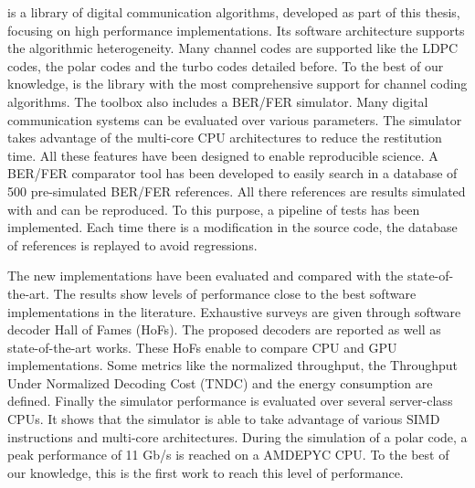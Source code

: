 \AFFECT is a library of digital communication algorithms, developed as part of
this thesis, focusing on high performance implementations. Its software
architecture supports the algorithmic heterogeneity. Many channel codes are
supported like the LDPC codes, the polar codes and the turbo codes detailed
before. To the best of our knowledge, \AFFECT is the library with the most
comprehensive support for channel coding algorithms. The toolbox also includes a
BER/FER simulator. Many digital communication systems can be evaluated over
various parameters. The simulator takes advantage of the multi-core CPU
architectures to reduce the restitution time. All these features have been
designed to enable reproducible science. A BER/FER comparator tool has been
developed to easily search in a database of 500 pre-simulated BER/FER
references. All there references are results simulated with \AFFECT and can be
reproduced. To this purpose, a pipeline of tests has been implemented. Each time
there is a modification in the source code, the database of references is
replayed to avoid regressions.

The new implementations have been evaluated and compared with the
state-of-the-art. The results show levels of performance close to the best
software implementations in the literature. Exhaustive surveys are given through
software decoder Hall of Fames (HoFs). The proposed decoders are reported as
well as state-of-the-art works. These HoFs enable to compare CPU and GPU
implementations. Some metrics like the normalized throughput, the Throughput
Under Normalized Decoding Cost (TNDC) and the energy consumption are defined.
Finally the \AFFECT simulator performance is evaluated over several server-class
CPUs. It shows that the simulator is able to take advantage of various SIMD
instructions and multi-core architectures. During the simulation of a polar
code, a peak performance of 11 Gb/s is reached on a AMD\R EPYC CPU. To the best
of our knowledge, this is the first work to reach this level of performance.

